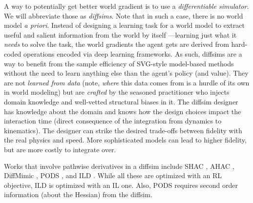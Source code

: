 \documentclass[12pt,a4paper]{article}
\begin{document}
A way to potentially get better world gradient is to use a \emph{differentiable simulator}.
We will abbreviate those as \textit{diffsims}.
Note that in such a case, there is no world model \textit{a priori}.
Instead of designing a learning task for a world model to extract useful and salient information
from the world by itself ---learning just what it \emph{needs} to solve the task,
the world gradients the agent gets are derived from hard-coded operations encoded via
deep learning frameworks.
As such, diffsims are a way to benefit from the sample efficiency of SVG-style model-based methods
without the need to learn anything else than the agent's policy (and value).
They are not \textit{learned from data} (note, \textit{where} this data comes from is a hurdle
of its own in world modeling) but are \textit{crafted} by the seasoned practitioner
who injects domain knowledge and well-vetted structural biases in it.
The diffsim designer has knowledge about the domain and knows how the design choices impact
the interaction time (direct consequence of the integration from dynamics to kinematics).
The designer can strike the desired trade-offs between fidelity with the real physics and speed.
More sophisticated models can lead to higher fidelity, but are more costly to integrate over.

Works that involve pathwise derivatives in a diffsim include
SHAC \cite{Xu2022-bz}, AHAC \cite{Georgiev2024-rs}, DiffMimic \cite{Ren2023-yc},
PODS \cite{Mora2021-pp}, and ILD \cite{Chen2022-zd}.
While all these are optimized with an RL objective, ILD is optimized with an IL one.
Also, PODS requires second order information (about the Hessian) from the diffsim.
\end{document}
